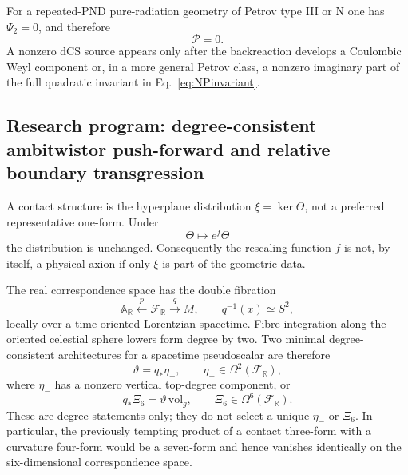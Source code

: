 \documentclass[aps,prd,reprint,nofootinbib,superscriptaddress]{revtex4-2}
\theoremstyle{definition}
\theoremstyle{remark}
\begin{document}
For a repeated-PND pure-radiation geometry of Petrov type III or N one has $\Psi_2=0$, and therefore
\begin{equation}
 \mathcal P=0.
 \label{eq:typeIIIPontryagin}
\end{equation}
A nonzero dCS source appears only after the backreaction develops a Coulombic Weyl component or, in a more general Petrov class, a nonzero imaginary part of the full quadratic invariant in Eq.~\eqref{eq:NPinvariant}.

\subsection{Research program: degree-consistent ambitwistor push-forward and relative boundary transgression}
\label{subsec:ResearchProgramPrecise}

A contact structure is the hyperplane distribution $\xi=\ker\Theta$, not a preferred representative one-form. Under
\begin{equation}
 \Theta\longmapsto e^f\Theta
 \label{eq:contactrescale}
\end{equation}
the distribution is unchanged. Consequently the rescaling function $f$ is not, by itself, a physical axion if only $\xi$ is part of the geometric data.

The real correspondence space has the double fibration
\begin{equation}
 \mathbb A_{\mathbb R}\xleftarrow{\ p\ }\mathcal F_{\mathbb R}
 \xrightarrow{\ q\ }M,
 \qquad q^{-1}(x)\simeq S^2,
 \label{eq:realCorrespondenceSpace}
\end{equation}
locally over a time-oriented Lorentzian spacetime. Fibre integration along the oriented celestial sphere lowers form degree by two. Two minimal degree-consistent architectures for a spacetime pseudoscalar are therefore
\begin{equation}
 \vartheta=q_*\eta_-,
 \qquad
 \eta_-\in\Omega^2(\mathcal F_{\mathbb R}),
 \label{eq:etaPushforward}
\end{equation}
where $\eta_-$ has a nonzero vertical top-degree component, or
\begin{equation}
 q_*\Xi_6=\vartheta\,\mathrm{vol}_g,
 \qquad
 \Xi_6\in\Omega^6(\mathcal F_{\mathbb R}).
 \label{eq:XiPushforward}
\end{equation}
These are degree statements only; they do not select a unique $\eta_-$ or $\Xi_6$. In particular, the previously tempting product of a contact three-form with a curvature four-form would be a seven-form and hence vanishes identically on the six-dimensional correspondence space.
\end{document}
